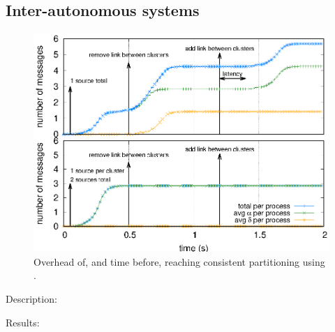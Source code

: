
\subsection{Inter-autonomous systems}

\begin{figure}
  \centering\includegraphics[width=0.99\columnwidth]{img/as_cast_geant.eps}
  \caption{\label{fig:complexity}Overhead of, and time before,
    reaching consistent partitioning using \NAME.}
\end{figure}

\begin{asparadesc}
\item [Description:] 
\item [Results:] 
\end{asparadesc}



